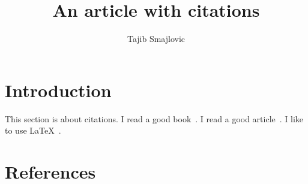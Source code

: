 \documentclass{article}
\title{An article with citations}
\author{Tajib Smajlovic}
\date{}
\begin{document}
	
	\maketitle
	
	\section{Introduction}
	This section is about citations. I read a good book~\cite{keyTwo}. I read a good article~\cite{keyOne}. I like to use \LaTeX~\cite{keyThree}.
	
	\subsection{}
	
	\subsection{}
	
	
	\section{References}
	
	
	
\end{document}

